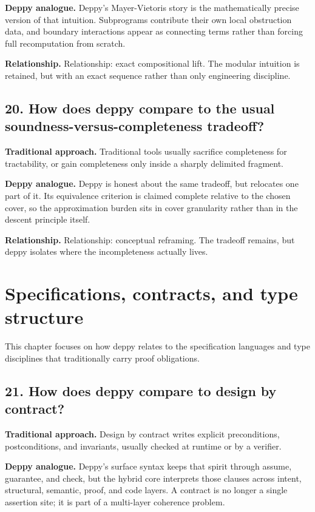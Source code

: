 \documentclass[11pt,openany]{book}
\begin{document}
\textbf{Deppy analogue.} Deppy's Mayer-Vietoris story is the mathematically precise version of that intuition. Subprograms contribute their own local obstruction data, and boundary interactions appear as connecting terms rather than forcing full recomputation from scratch.

\textbf{Relationship.} Relationship: exact compositional lift. The modular intuition is retained, but with an exact sequence rather than only engineering discipline.

\section*{20. How does deppy compare to the usual soundness-versus-completeness tradeoff?}
\textbf{Traditional approach.} Traditional tools usually sacrifice completeness for tractability, or gain completeness only inside a sharply delimited fragment.

\textbf{Deppy analogue.} Deppy is honest about the same tradeoff, but relocates one part of it. Its equivalence criterion is claimed complete relative to the chosen cover, so the approximation burden sits in cover granularity rather than in the descent principle itself.

\textbf{Relationship.} Relationship: conceptual reframing. The tradeoff remains, but deppy isolates where the incompleteness actually lives.

\chapter{Specifications, contracts, and type structure}
This chapter focuses on how deppy relates to the specification languages and type disciplines that traditionally carry proof obligations.

\section*{21. How does deppy compare to design by contract?}
\textbf{Traditional approach.} Design by contract writes explicit preconditions, postconditions, and invariants, usually checked at runtime or by a verifier.

\textbf{Deppy analogue.} Deppy's surface syntax keeps that spirit through assume, guarantee, and check, but the hybrid core interprets those clauses across intent, structural, semantic, proof, and code layers. A contract is no longer a single assertion site; it is part of a multi-layer coherence problem.
\end{document}
